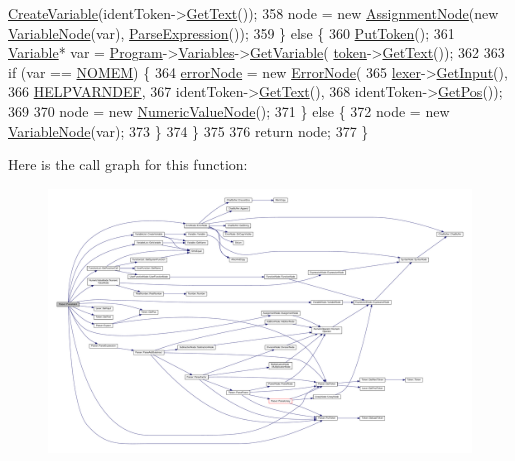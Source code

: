 \begin{DoxyCode}
      \hyperlink{classVariableList_ac78b3d52283bec7cbd8e7e2d217e1608}{CreateVariable}(identToken->\hyperlink{structToken_a15f1043de07ce8e452fbf115b85def71}{GetText}());
358         node = \textcolor{keyword}{new} \hyperlink{classAssignmentNode}{AssignmentNode}(\textcolor{keyword}{new} \hyperlink{classVariableNode}{VariableNode}(var), 
      \hyperlink{classParser_ae46b0a87abe76f40ae117c5bdcb2f29d}{ParseExpression}());
359     \} \textcolor{keywordflow}{else} \{
360         \hyperlink{classParser_adb5c3a188b36f7ecb198ae30f06338b3}{PutToken}();
361         \hyperlink{classVariable}{Variable}* var = \hyperlink{classProgram}{Program}->\hyperlink{classProgram_a1d4f53befb0270e64c91c24d14061188}{Variables}->\hyperlink{classVariableList_a2002862abdb75e088e2dd6bf1e140be6}{GetVariable}(
      \hyperlink{classParser_a467028559d31c5b33f16ca8be56715cc}{token}->\hyperlink{structToken_a15f1043de07ce8e452fbf115b85def71}{GetText}());
362 
363         \textcolor{keywordflow}{if} (var == \hyperlink{platform_8h_a46ff2bfbf0d44b8466a2251d5bd5e6f8}{NOMEM}) \{
364             \hyperlink{classParser_ab482ff79113ad2f1ef60bc6dd18528d1}{errorNode} = \textcolor{keyword}{new} \hyperlink{classErrorNode}{ErrorNode}(
365                 \hyperlink{classParser_a8a8214126b0b0455e3ce375f3e9b20bf}{lexer}->\hyperlink{classLexer_a3032cbeb851294bccd61b722d9a86265}{GetInput}(),
366                 \hyperlink{text_8h_a9a06b887cb924e98bf181b08a517e072}{HELPVARNDEF},
367                 identToken->\hyperlink{structToken_a15f1043de07ce8e452fbf115b85def71}{GetText}(),
368                 identToken->\hyperlink{structToken_a5f93ea94940a6eeb060507e1da594599}{GetPos}());
369 
370             node = \textcolor{keyword}{new} \hyperlink{classNumericValueNode}{NumericValueNode}();
371         \} \textcolor{keywordflow}{else} \{
372             node = \textcolor{keyword}{new} \hyperlink{classVariableNode}{VariableNode}(var);
373         \}
374     \}
375 
376     \textcolor{keywordflow}{return} node;
377 \}
\end{DoxyCode}


Here is the call graph for this function\+:
\nopagebreak
\begin{figure}[H]
\begin{center}
\leavevmode
\includegraphics[width=350pt]{d0/d40/classParser_a84af27a6f4e42888eba6ac36ccd0815c_cgraph}
\end{center}
\end{figure}




